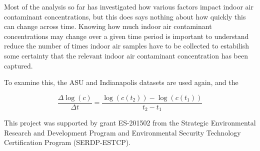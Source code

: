 \documentclass[journal=esthag,manuscript=article]{achemso}
\begin{document}
Most of the analysis so far has investigated how various factors impact indoor air contaminant concentrations, but this does says nothing about how quickly this can change across time.
Knowing how much indoor air contaminant concentrations may change over a given time period is important to understand reduce the number of times indoor air samples have to be collected to estabilish some certainty that the relevant indoor air contaminant concentration has been captured. \par

To examine this, the ASU and Indianapolis datasets are used again, and the 

\begin{equation}
  \frac{\Delta\log{(c)}}{\Delta t} = \frac{\log{(c(t_2))} - \log{(c(t_1))}}{t_2 - t_1}
\end{equation}

\begin{acknowledgement}
This project was supported by grant ES-201502 from the Strategic Environmental Research and Development Program and Environmental Security Technology Certification Program (SERDP-ESTCP).
\end{acknowledgement}
\end{document}

